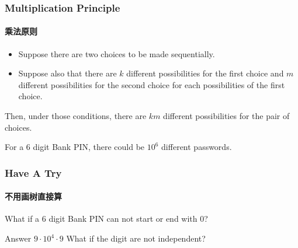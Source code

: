 \documentclass[
	11pt, %
]{beamer}
\begin{document}

\begin{frame}
	\frametitle{Multiplication Principle} %
	\framesubtitle{乘法原则}
	\begin{definition}
		\begin{itemize}
			\item Suppose there are two choices to be made sequentially.
			\item Suppose also that there are $k$ different possibilities for the first choice and $m$ different possibilities for the second choice for each possibilities of the first choice. 
		\end{itemize}
				Then, \alert{under those conditions}, there are $km$ different possibilities for the pair of choices.
	\end{definition}
	\begin{example}
	For a 6 digit Bank PIN, there could be $10^6$ different passwords. 
	\end{example}
\end{frame}


\begin{frame}
	\frametitle{Have A Try} %
	\framesubtitle{ 不用画树直接算}
	What if a 6 digit Bank PIN can not start or end with 0?

	\bigskip \bigskip
	Answer \textbf{$9 \cdot 10^4 \cdot 9$}
	\alert{What if the digit are not independent?}
\end{frame}

\end{document}
